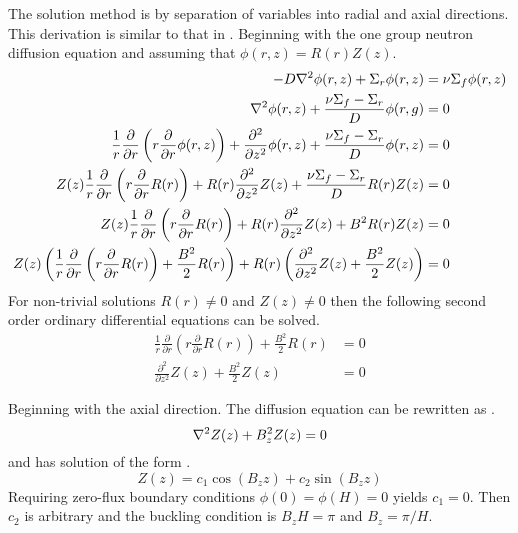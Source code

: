   The solution method is by separation of variables into radial and axial 
  directions. This derivation is similar to that in . Beginning
  with the one group neutron diffusion equation  and assuming
  that  $\phi(r,z) = R(r) Z(z)$.
  \begin{align}
    -D \mathbf{\nabla}^2 \phi(r,z) + \Sigma_r \phi(r,z) &= \nu \Sigma_f \phi(r,z) \\
    \mathbf{\nabla}^2 \phi(r,z) + \frac{\nu\Sigma_f - \Sigma_r}{D} \phi(r,g) &= 0 \\
    \frac{1}{r} \frac{\partial}{\partial r} \left( r \frac{\partial}{\partial r}
      \phi(r,z) \right) + \frac{\partial^2}{\partial z^2} \phi(r,z) +
      \frac{\nu\Sigma_f - \Sigma_r}{D} \phi(r,z) &= 0 \\
    Z(z) \frac{1}{r} \frac{\partial}{\partial r} \left( r 
      \frac{\partial}{\partial r} R(r) \right) + 
      R(r) \frac{\partial^2}{\partial z^2} Z(z) + 
      \frac{\nu\Sigma_f - \Sigma_r}{D} R(r) Z(z) &= 0 \\
    Z(z) \frac{1}{r} \frac{\partial}{\partial r} \left( r 
      \frac{\partial}{\partial r} R(r) \right) + 
      R(r) \frac{\partial^2}{\partial z^2} Z(z) + 
      B^2 R(r) Z(z) &= 0 \\
    Z(z) \left( \frac{1}{r} \frac{\partial}{\partial r} \left( r 
      \frac{\partial}{\partial r} R(r) \right) + \frac{B^2}{2} R(r) \right) + 
      R(r) \left( \frac{\partial^2}{\partial z^2} Z(z) + \frac{B^2}{2} Z(z) 
      \right) &= 0
  \end{align}
  For non-trivial solutions $R(r) \ne 0$ and $Z(z) \ne 0$ then the following
  second order ordinary differential equations can be solved.
  \begin{align}
    \label{eq:cyl_radialR}
    \frac{1}{r} \frac{\partial}{\partial r} \left( r \frac{\partial}{\partial r}
      R(r) \right) + \frac{B^2}{2} R(r) &= 0 \\
    \label{eq:cyl_axialZ}
    \frac{\partial^2}{\partial z^2} Z(z) + \frac{B^2}{2} Z(z) &= 0
  \end{align}
  
  Beginning with the axial direction. The diffusion equation can be rewritten as 
  .
  \begin{equation} \label{eq:simplediffusion}
    \mathbf{\nabla}^2 Z(z) + B_z^2 Z(z) = 0
  \end{equation}
  and has solution of the form .
  \begin{equation} \label{eq:cyl_axial}
    Z(z) = c_1 \cos(B_z z) + c_2 \sin(B_z z)
  \end{equation}
  Requiring zero-flux boundary conditions $\phi(0)=\phi(H)=0$ yields $c_1=0$. 
  Then $c_2$ is arbitrary and the buckling condition is $B_zH=\pi$ and $B_z=\pi/H$.
  
